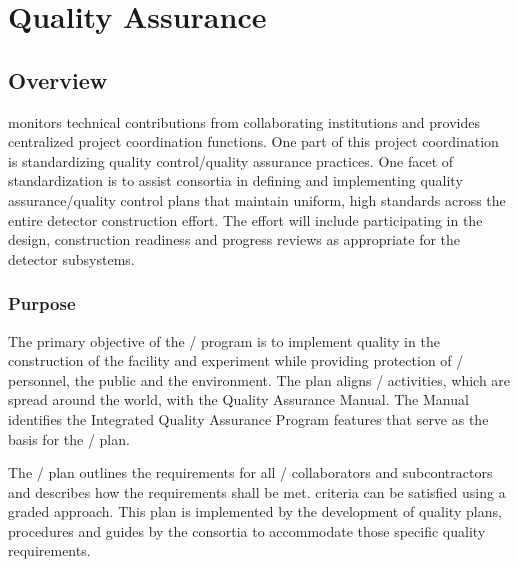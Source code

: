 \chapter{Quality Assurance}
\label{vl:tc-QA}

\section{Overview}

  monitors technical contributions from
collaborating institutions and provides centralized project
coordination functions. One part of this project
coordination is standardizing quality control/quality
assurance practices. One facet of standardization
is to assist consortia in defining and implementing
quality assurance/quality control plans that maintain uniform,
high standards across the entire detector construction
effort.  The  effort will include participating in the
design, construction readiness and progress reviews as appropriate for
the  detector subsystems. 

\subsection{Purpose}

The primary objective of the /   program
is to implement quality in the construction of the  facility and
 experiment while providing protection of / personnel, the
public and the environment. The  plan aligns /  
activities, which are spread around the world, with the \fnal
Quality Assurance Manual. The Manual identifies the \fnal
Integrated Quality Assurance Program features that serve as the basis
for the /  plan.

The /  plan outlines the 
requirements for all / collaborators and
subcontractors and describes how the requirements shall be met. 
criteria can be satisfied using a graded approach. This  plan is
implemented by the development of quality plans, procedures and guides
by the consortia to accommodate those specific quality requirements.

